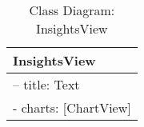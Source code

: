 \begin{table}[H]
\centering
\caption{Class Diagram: InsightsView}

\hspace{1em}
\renewcommand{\arraystretch}{1.7}

\begin{tabular}{|l|}
\hline
\textbf{InsightsView} \\
\hline
– title: Text \\
- charts: [ChartView] \\
\hline
\end{tabular}
\end{table}

